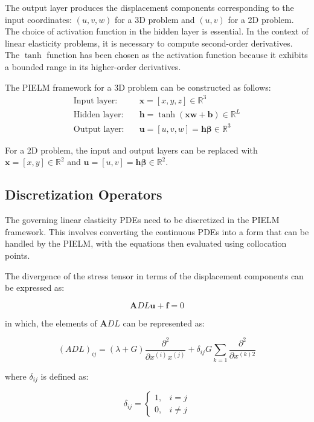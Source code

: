 \documentclass[11pt]{article}
\begin{document}
The output layer produces the displacement components corresponding to the input coordinates: $(u, v, w)$ for a 3D problem and $(u, v)$ for a 2D problem. The choice of activation function in the hidden layer is essential. In the context of linear elasticity problems, it is necessary to compute second-order derivatives. The $\tanh$ function has been chosen as the activation function because it exhibits a bounded range in its higher-order derivatives.

The PIELM framework for a 3D problem can be constructed as follows:
\begin{align}
\text{Input layer:} \quad & \mathbf{x} = [x, y, z] \in \mathbb{R}^3 \\
\text{Hidden layer:} \quad & \mathbf{h} = \tanh(\mathbf{x}\mathbf{w} + \mathbf{b}) \in \mathbb{R}^L \\
\text{Output layer:} \quad & \mathbf{u} = [u, v, w] = \mathbf{h}\boldsymbol{\beta} \in \mathbb{R}^3
\end{align}

For a 2D problem, the input and output layers can be replaced with $\mathbf{x} = [x, y] \in \mathbb{R}^2$ and $\mathbf{u} = [u, v] = \mathbf{h}\boldsymbol{\beta} \in \mathbb{R}^2$.

\subsection{Discretization Operators}

The governing linear elasticity PDEs need to be discretized in the PIELM framework. This involves converting the continuous PDEs into a form that can be handled by the PIELM, with the equations then evaluated using collocation points.

The divergence of the stress tensor in terms of the displacement components can be expressed as:

\begin{equation}
\mathbf{A}D L\mathbf{u} + \mathbf{f} = 0
\end{equation}

in which, the elements of $\mathbf{A}DL$ can be represented as:

\begin{equation}
(ADL)_{ij} = (\lambda + G)\frac{\partial^2}{\partial x^{(i)}x^{(j)}} + \delta_{ij}G\sum_{k=1}\frac{\partial^2}{\partial x^{(k)2}}
\end{equation}

where $\delta_{ij}$ is defined as:

\begin{equation}
\delta_{ij} = 
\begin{cases}
1, & i = j \\
0, & i \neq j
\end{cases}
\end{equation}
\end{document}
